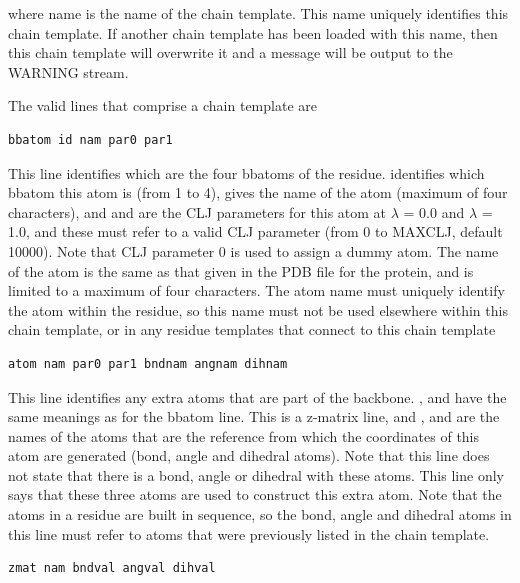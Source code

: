 \documentclass[letterpaper,10pt,english]{sphinxmanual}
\begin{document}
where name is the name of the chain template. This name uniquely identifies this chain template. If another chain template has been loaded with this name, then this chain template will overwrite it and a message will be output to the WARNING stream.

The valid lines that comprise a chain template are

\begin{Verbatim}[commandchars=\\\{\}]
bbatom id nam par0 par1
\end{Verbatim}

This line identifies which are the four bbatoms of the residue.  identifies which bbatom this atom is (from 1 to 4),  gives the name of the atom (maximum of four characters), and  and  are the CLJ parameters for this atom at \(\lambda\) = 0.0 and \(\lambda\) = 1.0, and these must refer to a valid CLJ parameter (from 0 to MAXCLJ, default 10000). Note that CLJ parameter 0 is used to assign a dummy atom. The name of the atom is the same as that given in the PDB file for the protein, and is limited to a maximum of four characters. The atom name must uniquely identify the atom within the residue, so this name must not be used elsewhere within this chain template, or in any residue templates that connect to this chain template

\begin{Verbatim}[commandchars=\\\{\}]
atom nam par0 par1 bndnam angnam dihnam
\end{Verbatim}

This line identifies any extra atoms that are part of the backbone. ,  and  have the same meanings as for the bbatom line. This is a z-matrix line, and ,  and  are the names of the atoms that are the reference from which the coordinates of this atom are generated (bond, angle and dihedral atoms). Note that this line does not state that there is a bond, angle or dihedral with these atoms. This line only says that these three atoms are used to construct this extra atom. Note that the atoms in a residue are built in sequence, so the bond, angle and dihedral atoms in this line must refer to atoms that were previously listed in the chain template.

\begin{Verbatim}[commandchars=\\\{\}]
zmat nam bndval angval dihval
\end{Verbatim}
\end{document}
